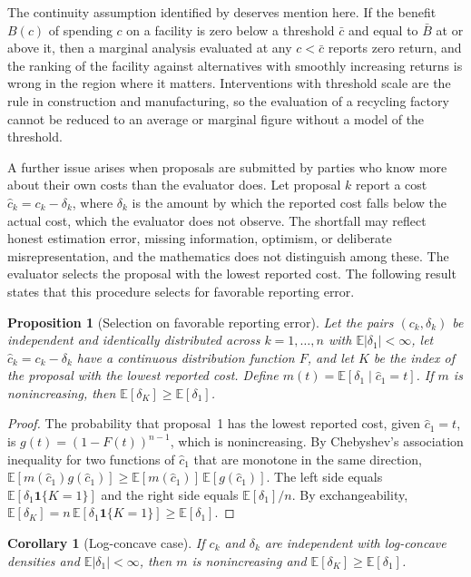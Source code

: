\documentclass[11pt]{article}
\newtheorem{proposition}{Proposition}
\newtheorem{corollary}{Corollary}
\theoremstyle{definition}
\theoremstyle{remark}
\newcommand{\E}{\mathbb{E}}
\begin{document}
The continuity assumption identified by \citet{cote2023} deserves mention here. If the benefit $B(c)$ of spending $c$ on a facility is zero below a threshold $\bar c$ and equal to $\bar B$ at or above it, then a marginal analysis evaluated at any $c<\bar c$ reports zero return, and the ranking of the facility against alternatives with smoothly increasing returns is wrong in the region where it matters. Interventions with threshold scale are the rule in construction and manufacturing, so the evaluation of a recycling factory cannot be reduced to an average or marginal figure without a model of the threshold.

A further issue arises when proposals are submitted by parties who know more about their own costs than the evaluator does. Let proposal $k$ report a cost $\hat c_k=c_k-\delta_k$, where $\delta_k$ is the amount by which the reported cost falls below the actual cost, which the evaluator does not observe. The shortfall may reflect honest estimation error, missing information, optimism, or deliberate misrepresentation, and the mathematics does not distinguish among these. The evaluator selects the proposal with the lowest reported cost. The following result states that this procedure selects for favorable reporting error.

\begin{proposition}[Selection on favorable reporting error]
\label{prop:report}
Let the pairs $(c_k,\delta_k)$ be independent and identically distributed across $k=1,\dots,n$ with $\E|\delta_1|<\infty$, let $\hat c_k=c_k-\delta_k$ have a continuous distribution function $F$, and let $K$ be the index of the proposal with the lowest reported cost. Define $m(t)=\E[\delta_1\mid\hat c_1=t]$. If $m$ is nonincreasing, then $\E[\delta_K]\ge\E[\delta_1]$.
\end{proposition}

\begin{proof}
The probability that proposal~1 has the lowest reported cost, given $\hat c_1=t$, is $g(t)=(1-F(t))^{n-1}$, which is nonincreasing. By Chebyshev's association inequality for two functions of $\hat c_1$ that are monotone in the same direction, $\E[m(\hat c_1)g(\hat c_1)]\ge\E[m(\hat c_1)]\,\E[g(\hat c_1)]$. The left side equals $\E[\delta_1\mathbf 1\{K=1\}]$ and the right side equals $\E[\delta_1]/n$. By exchangeability, $\E[\delta_K]=n\,\E[\delta_1\mathbf 1\{K=1\}]\ge\E[\delta_1]$.
\end{proof}

\begin{corollary}[Log-concave case]
\label{cor:logconcave}
If $c_k$ and $\delta_k$ are independent with log-concave densities and $\E|\delta_1|<\infty$, then $m$ is nonincreasing and $\E[\delta_K]\ge\E[\delta_1]$.
\end{corollary}
\end{document}

